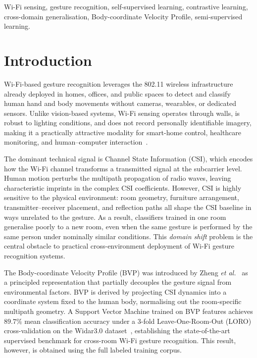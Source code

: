 \documentclass[journal]{IEEEtran}
\begin{document}
\begin{IEEEkeywords}
Wi-Fi sensing, gesture recognition, self-supervised learning,
contrastive learning, cross-domain generalisation,
Body-coordinate Velocity Profile, semi-supervised learning.
\end{IEEEkeywords}

\section{Introduction}
\label{sec:intro}

Wi-Fi-based gesture recognition leverages the 802.11 wireless
infrastructure already deployed in homes, offices, and public spaces
to detect and classify human hand and body movements without cameras,
wearables, or dedicated sensors.
Unlike vision-based systems, Wi-Fi sensing operates through walls,
is robust to lighting conditions, and does not record personally
identifiable imagery, making it a practically attractive modality for
smart-home control, healthcare monitoring, and human--computer
interaction~\cite{ma2023sensefi}.

The dominant technical signal is Channel State Information (CSI),
which encodes how the Wi-Fi channel transforms a transmitted signal
at the subcarrier level.
Human motion perturbs the multipath propagation of radio waves,
leaving characteristic imprints in the complex CSI coefficients.
However, CSI is highly sensitive to the physical environment: room
geometry, furniture arrangement, transmitter--receiver placement, and
reflection paths all shape the CSI baseline in ways unrelated to
the gesture.
As a result, classifiers trained in one room generalise poorly to a
new room, even when the same gesture is performed by the same person
under nominally similar conditions.
This \emph{domain shift} problem is the central obstacle to practical
cross-environment deployment of Wi-Fi gesture recognition systems.

The Body-coordinate Velocity Profile (BVP) was introduced by Zheng
\textit{et al.}~\cite{zheng2019widar3} as a principled representation
that partially decouples the gesture signal from environmental factors.
BVP is derived by projecting CSI dynamics into a coordinate system
fixed to the human body, normalising out the room-specific multipath
geometry.
A Support Vector Machine trained on BVP features achieves $89.7\%$
mean classification accuracy under a 3-fold Leave-One-Room-Out (LORO)
cross-validation on the Widar3.0 dataset~\cite{zheng2019widar3},
establishing the state-of-the-art supervised benchmark for
cross-room Wi-Fi gesture recognition.
This result, however, is obtained using the full labeled training corpus.
\end{document}
